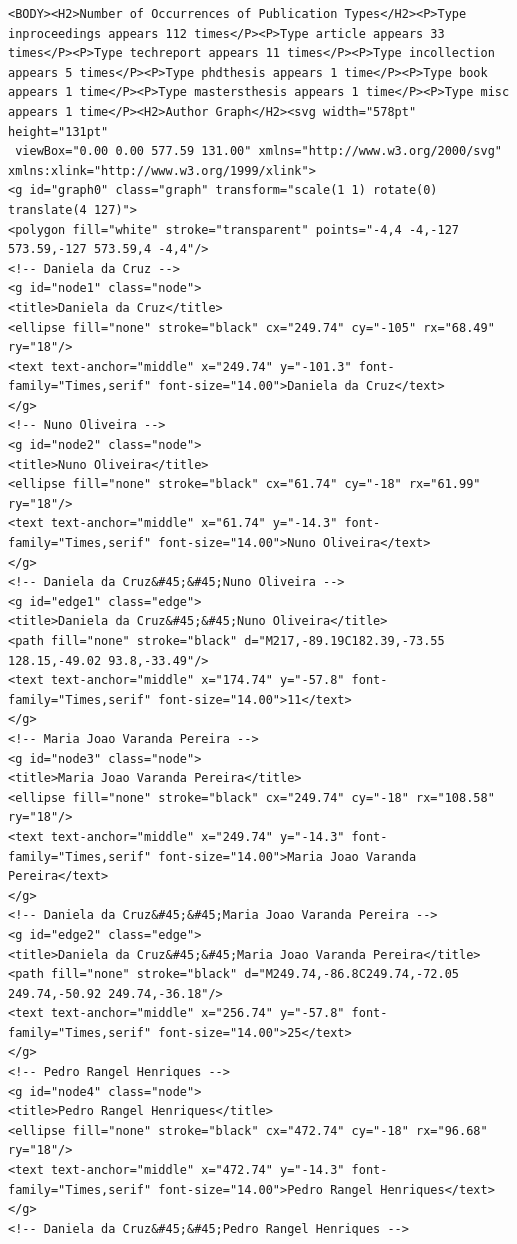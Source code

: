 \documentclass[11pt,a4paper]{report}
\begin{document}
\begin{appendices}
\begin{lstlisting}
<BODY><H2>Number of Occurrences of Publication Types</H2><P>Type inproceedings appears 112 times</P><P>Type article appears 33 times</P><P>Type techreport appears 11 times</P><P>Type incollection appears 5 times</P><P>Type phdthesis appears 1 time</P><P>Type book appears 1 time</P><P>Type mastersthesis appears 1 time</P><P>Type misc appears 1 time</P><H2>Author Graph</H2><svg width="578pt" height="131pt"
 viewBox="0.00 0.00 577.59 131.00" xmlns="http://www.w3.org/2000/svg" xmlns:xlink="http://www.w3.org/1999/xlink">
<g id="graph0" class="graph" transform="scale(1 1) rotate(0) translate(4 127)">
<polygon fill="white" stroke="transparent" points="-4,4 -4,-127 573.59,-127 573.59,4 -4,4"/>
<!-- Daniela da Cruz -->
<g id="node1" class="node">
<title>Daniela da Cruz</title>
<ellipse fill="none" stroke="black" cx="249.74" cy="-105" rx="68.49" ry="18"/>
<text text-anchor="middle" x="249.74" y="-101.3" font-family="Times,serif" font-size="14.00">Daniela da Cruz</text>
</g>
<!-- Nuno Oliveira -->
<g id="node2" class="node">
<title>Nuno Oliveira</title>
<ellipse fill="none" stroke="black" cx="61.74" cy="-18" rx="61.99" ry="18"/>
<text text-anchor="middle" x="61.74" y="-14.3" font-family="Times,serif" font-size="14.00">Nuno Oliveira</text>
</g>
<!-- Daniela da Cruz&#45;&#45;Nuno Oliveira -->
<g id="edge1" class="edge">
<title>Daniela da Cruz&#45;&#45;Nuno Oliveira</title>
<path fill="none" stroke="black" d="M217,-89.19C182.39,-73.55 128.15,-49.02 93.8,-33.49"/>
<text text-anchor="middle" x="174.74" y="-57.8" font-family="Times,serif" font-size="14.00">11</text>
</g>
<!-- Maria Joao Varanda Pereira -->
<g id="node3" class="node">
<title>Maria Joao Varanda Pereira</title>
<ellipse fill="none" stroke="black" cx="249.74" cy="-18" rx="108.58" ry="18"/>
<text text-anchor="middle" x="249.74" y="-14.3" font-family="Times,serif" font-size="14.00">Maria Joao Varanda Pereira</text>
</g>
<!-- Daniela da Cruz&#45;&#45;Maria Joao Varanda Pereira -->
<g id="edge2" class="edge">
<title>Daniela da Cruz&#45;&#45;Maria Joao Varanda Pereira</title>
<path fill="none" stroke="black" d="M249.74,-86.8C249.74,-72.05 249.74,-50.92 249.74,-36.18"/>
<text text-anchor="middle" x="256.74" y="-57.8" font-family="Times,serif" font-size="14.00">25</text>
</g>
<!-- Pedro Rangel Henriques -->
<g id="node4" class="node">
<title>Pedro Rangel Henriques</title>
<ellipse fill="none" stroke="black" cx="472.74" cy="-18" rx="96.68" ry="18"/>
<text text-anchor="middle" x="472.74" y="-14.3" font-family="Times,serif" font-size="14.00">Pedro Rangel Henriques</text>
</g>
<!-- Daniela da Cruz&#45;&#45;Pedro Rangel Henriques -->

\end{lstlisting}
\end{appendices}
\end{document}
